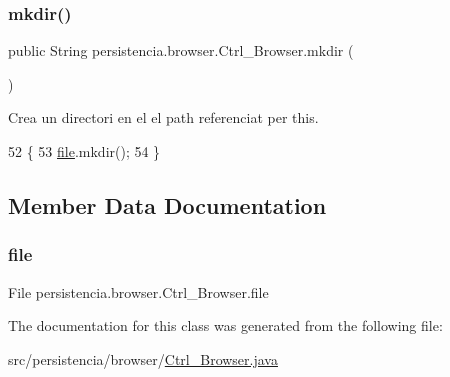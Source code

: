 \subsubsection{\texorpdfstring{mkdir()}{mkdir()}}
{\footnotesize\ttfamily public String persistencia.\+browser.\+Ctrl\+\_\+\+Browser.\+mkdir (\begin{DoxyParamCaption}{ }\end{DoxyParamCaption})\hspace{0.3cm}{\ttfamily [inline]}}



Crea un directori en el el path referenciat per this. 


\begin{DoxyCode}
52                         \{
53         \hyperlink{classpersistencia_1_1browser_1_1Ctrl__Browser_a72c151aed575c0848f7dbb1609b373c8}{file}.mkdir();
54     \}
\end{DoxyCode}


\subsection{Member Data Documentation}
\mbox{\label{classpersistencia_1_1browser_1_1Ctrl__Browser_a72c151aed575c0848f7dbb1609b373c8}} 
\subsubsection{\texorpdfstring{file}{file}}
{\footnotesize\ttfamily File persistencia.\+browser.\+Ctrl\+\_\+\+Browser.\+file\hspace{0.3cm}{\ttfamily [private]}}



The documentation for this class was generated from the following file\+:\begin{DoxyCompactItemize}
\item 
src/persistencia/browser/\hyperlink{Ctrl__Browser_8java}{Ctrl\+\_\+\+Browser.\+java}\end{DoxyCompactItemize}
